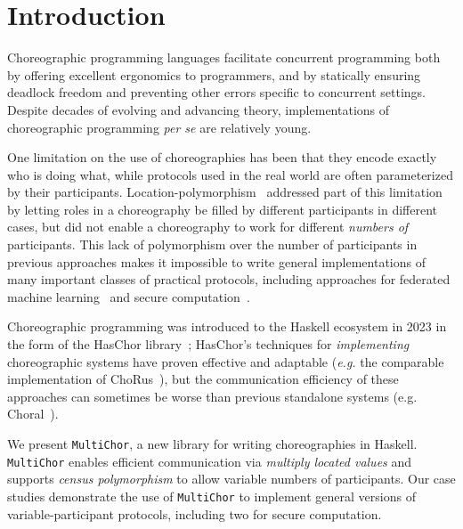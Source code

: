 \documentclass[sigplan,screen,review,anonymous]{acmart}
\newcommand{\HasChor}{Has\-Chor\xspace}
\newcommand{\MultiChor}{\texttt{Multi\-Chor}\xspace}
\begin{document}
\section{Introduction}\label{sec:introduction}
Choreographic programming languages facilitate concurrent programming
both by offering excellent ergonomics to programmers,
and by statically ensuring deadlock freedom and preventing other errors
specific to concurrent settings.
Despite decades of evolving and advancing theory,
implementations of choreographic programming \textit{per se} are relatively young.

One limitation on the use of choreographies has been that they encode exactly who is doing what,
while protocols used in the real world are often
parameterized by their participants.
Location-polymorphism~\cite{graversen2023polychor} addressed part of this limitation
by letting roles in a choreography be filled by different participants in different cases,
but did not enable a choreography to work for different \emph{numbers of} participants.
This lack of polymorphism over the number of participants in previous approaches makes it impossible to write general implementations of many important classes of practical protocols, including approaches for federated machine learning~\cite{bonawitz2019towards, wu2020safa, li2021model} and secure computation~\cite{keller2020mp, corrigan2017prio, bonawitz2017practical, dprio2023, goldreich2019play}.

Choreographic programming was introduced to the Haskell ecosystem
in 2023 in the form of the \HasChor library~\cite{haschor};
\HasChor's techniques for \emph{implementing} choreographic systems have proven effective
and adaptable (\textit{e.g.} the comparable implementation of ChoRus~\cite{chorus}),
but the communication efficiency of these approaches can sometimes be worse than previous standalone systems (e.g. Choral~\cite{choral}).

We present \MultiChor, a new library for writing choreographies in Haskell. \MultiChor enables efficient communication via \emph{multiply located values} and supports \emph{census polymorphism} to allow variable numbers of participants. Our case studies demonstrate the use of \MultiChor to implement general versions of variable-participant protocols, including two for secure computation.
\end{document}
